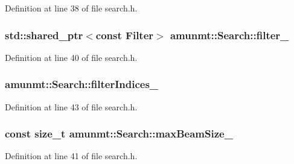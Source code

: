 Definition at line 38 of file search.\+h.

\subsubsection[{\texorpdfstring{filter\+\_\+}{filter_}}]{\setlength{\rightskip}{0pt plus 5cm}std\+::shared\+\_\+ptr$<$const {\bf Filter}$>$ amunmt\+::\+Search\+::filter\+\_\+\hspace{0.3cm}{\ttfamily [protected]}}\hypertarget{classamunmt_1_1Search_a7f88d68c699628bd5022ba947f3e95e8}{}\label{classamunmt_1_1Search_a7f88d68c699628bd5022ba947f3e95e8}


Definition at line 40 of file search.\+h.

\subsubsection[{\texorpdfstring{filter\+Indices\+\_\+}{filterIndices_}}]{ amunmt\+::\+Search\+::filter\+Indices\+\_\+\hspace{0.3cm}{\ttfamily [protected]}}\hypertarget{classamunmt_1_1Search_abadfb4133f18d21a442cbf183a3c7b58}{}\label{classamunmt_1_1Search_abadfb4133f18d21a442cbf183a3c7b58}


Definition at line 43 of file search.\+h.

\subsubsection[{\texorpdfstring{max\+Beam\+Size\+\_\+}{maxBeamSize_}}]{\setlength{\rightskip}{0pt plus 5cm}const size\+\_\+t amunmt\+::\+Search\+::max\+Beam\+Size\+\_\+\hspace{0.3cm}{\ttfamily [protected]}}\hypertarget{classamunmt_1_1Search_ab06351b3fe1ae98f6b839bb088f59ea9}{}\label{classamunmt_1_1Search_ab06351b3fe1ae98f6b839bb088f59ea9}


Definition at line 41 of file search.\+h.

